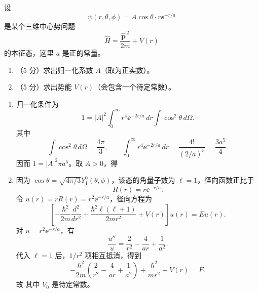\begin{question}[共 10 分]
设
\[
\psi(r,\theta,\phi)=A\cos\theta\cdot r\ee^{-r/a}
\]
是某个三维中心势问题
\[
\hat H=\frac{\hat{\mathbf p}^{\,2}}{2m}+V(r)
\]
的本征态，这里 $a$ 是正的常量。
\begin{enumerate}
  \item （5 分）求出归一化系数 $A$（取为正实数）。
  \item （5 分）求出势能 $V(r)$（会包含一个待定常数）。
\end{enumerate}
\begin{solution}
\begin{enumerate}
  \item 归一化条件为
  \[
  1=|A|^2\int_0^\infty r^4\ee^{-2r/a}\,dr\int\cos^2\theta\,d\Omega.
  \]
  其中
  \[
  \int\cos^2\theta\,d\Omega=\frac{4\pi}{3},
  \qquad
  \int_0^\infty r^4\ee^{-2r/a}\,dr=\frac{4!}{(2/a)^5}=\frac{3a^5}{4}.
  \]
  因而 $1=|A|^2\pi a^5$。取 $A>0$，得
  \item 因为 $\cos\theta=\sqrt{4\pi/3}Y_1^0(\theta,\phi)$，该态的角量子数为 $\ell=1$，径向函数正比于
  \[
  R(r)=r\ee^{-r/a}.
  \]
  令 $u(r)=rR(r)=r^2\ee^{-r/a}$，径向方程为
  \[
  \left[-\frac{\hbar^2}{2m}\frac{d^2}{dr^2}+\frac{\hbar^2\ell(\ell+1)}{2mr^2}+V(r)\right]u(r)=E u(r).
  \]
  对 $u=r^2\ee^{-r/a}$，有
  \[
  \frac{u''}{u}=\frac{2}{r^2}-\frac{4}{ar}+\frac{1}{a^2}.
  \]
  代入 $\ell=1$ 后，$1/r^2$ 项相互抵消，得到
  \[
  -\frac{\hbar^2}{2m}\left(\frac{2}{r^2}-\frac{4}{ar}+\frac{1}{a^2}\right)
  +\frac{\hbar^2}{mr^2}+V(r)=E.
  \]
  故
  其中 $V_0$ 是待定常数。
\end{enumerate}
\end{solution}
\end{question}

